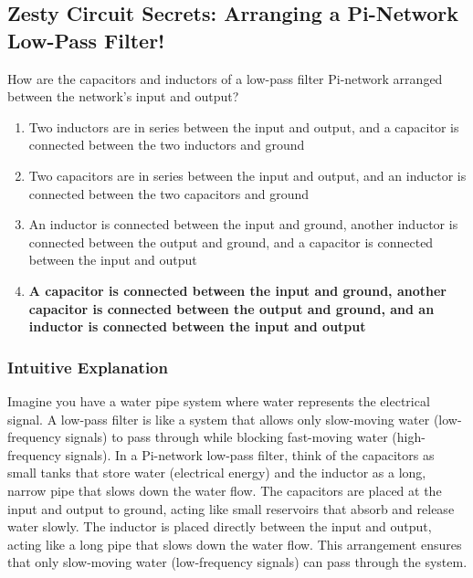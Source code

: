 \subsection{Zesty Circuit Secrets: Arranging a Pi-Network Low-Pass Filter!}

\begin{tcolorbox}[colback=gray!10!white,colframe=black!75!black,title=E7C01] How are the capacitors and inductors of a low-pass filter Pi-network arranged between the network’s input and output?
    \begin{enumerate}[label=\Alph*),noitemsep]
        \item Two inductors are in series between the input and output, and a capacitor is connected between the two inductors and ground
        \item Two capacitors are in series between the input and output, and an inductor is connected between the two capacitors and ground
        \item An inductor is connected between the input and ground, another inductor is connected between the output and ground, and a capacitor is connected between the input and output
        \item \textbf{A capacitor is connected between the input and ground, another capacitor is connected between the output and ground, and an inductor is connected between the input and output}
    \end{enumerate}
\end{tcolorbox}

\subsubsection{Intuitive Explanation}
Imagine you have a water pipe system where water represents the electrical signal. A low-pass filter is like a system that allows only slow-moving water (low-frequency signals) to pass through while blocking fast-moving water (high-frequency signals). In a Pi-network low-pass filter, think of the capacitors as small tanks that store water (electrical energy) and the inductor as a long, narrow pipe that slows down the water flow. The capacitors are placed at the input and output to ground, acting like small reservoirs that absorb and release water slowly. The inductor is placed directly between the input and output, acting like a long pipe that slows down the water flow. This arrangement ensures that only slow-moving water (low-frequency signals) can pass through the system.

